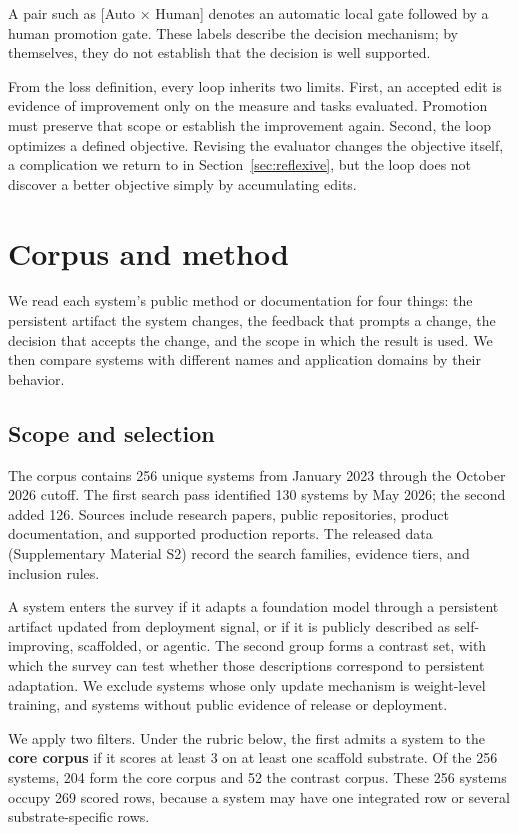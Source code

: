 A pair such as {[}Auto × Human{]} denotes an automatic local gate followed by a human promotion gate. These labels describe the decision mechanism; by themselves, they do not establish that the decision is well supported.

From the loss definition, every loop inherits two limits. First, an accepted edit is evidence of improvement only on the measure and tasks evaluated. Promotion must preserve that scope or establish the improvement again. Second, the loop optimizes a defined objective. Revising the evaluator changes the objective itself, a complication we return to in Section~\ref{sec:reflexive}, but the loop does not discover a better objective simply by accumulating edits.

\section{Corpus and method}\label{sec:method}

We read each system's public method or documentation for four things: the persistent artifact the system changes, the feedback that prompts a change, the decision that accepts the change, and the scope in which the result is used. We then compare systems with different names and application domains by their behavior.

\subsection{Scope and selection}\label{scope-and-selection}

The corpus contains 256 unique systems from January 2023 through the October 2026 cutoff. The first search pass identified 130 systems by May 2026; the second added 126. Sources include research papers, public repositories, product documentation, and supported production reports. The released data (Supplementary Material S2) record the search families, evidence tiers, and inclusion rules.

A system enters the survey if it adapts a foundation model through a persistent artifact updated from deployment signal, or if it is publicly described as self-improving, scaffolded, or agentic. The second group forms a contrast set, with which the survey can test whether those descriptions correspond to persistent adaptation. We exclude systems whose only update mechanism is weight-level training, and systems without public evidence of release or deployment.

We apply two filters. Under the rubric below, the first admits a system to the \textbf{core corpus} if it scores at least 3 on at least one scaffold substrate. Of the 256 systems, 204 form the core corpus and 52 the contrast corpus. These 256 systems occupy 269 scored rows, because a system may have one integrated row or several substrate-specific rows.

